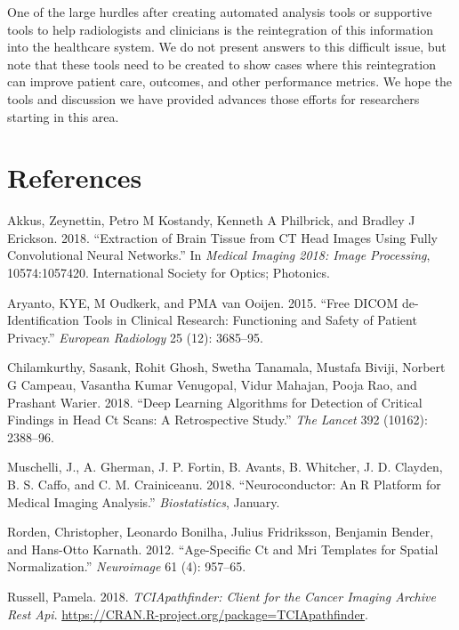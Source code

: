 \documentclass[]{elsarticle} %
\begin{document}
One of the large hurdles after creating automated analysis tools or
supportive tools to help radiologists and clinicians is the
reintegration of this information into the healthcare system. We do not
present answers to this difficult issue, but note that these tools need
to be created to show cases where this reintegration can improve patient
care, outcomes, and other performance metrics. We hope the tools and
discussion we have provided advances those efforts for researchers
starting in this area.

\hypertarget{references}{%
\section*{References}\label{references}}

\hypertarget{refs}{}
\leavevmode\hypertarget{ref-ct_bet}{}%
Akkus, Zeynettin, Petro M Kostandy, Kenneth A Philbrick, and Bradley J
Erickson. 2018. ``Extraction of Brain Tissue from CT Head Images Using
Fully Convolutional Neural Networks.'' In \emph{Medical Imaging 2018:
Image Processing}, 10574:1057420. International Society for Optics;
Photonics.

\leavevmode\hypertarget{ref-aryanto2015free}{}%
Aryanto, KYE, M Oudkerk, and PMA van Ooijen. 2015. ``Free DICOM
de-Identification Tools in Clinical Research: Functioning and Safety of
Patient Privacy.'' \emph{European Radiology} 25 (12): 3685--95.

\leavevmode\hypertarget{ref-cq500}{}%
Chilamkurthy, Sasank, Rohit Ghosh, Swetha Tanamala, Mustafa Biviji,
Norbert G Campeau, Vasantha Kumar Venugopal, Vidur Mahajan, Pooja Rao,
and Prashant Warier. 2018. ``Deep Learning Algorithms for Detection of
Critical Findings in Head Ct Scans: A Retrospective Study.'' \emph{The
Lancet} 392 (10162): 2388--96.

\leavevmode\hypertarget{ref-neuroconductor}{}%
Muschelli, J., A. Gherman, J. P. Fortin, B. Avants, B. Whitcher, J. D.
Clayden, B. S. Caffo, and C. M. Crainiceanu. 2018. ``Neuroconductor: An
R Platform for Medical Imaging Analysis.'' \emph{Biostatistics},
January.

\leavevmode\hypertarget{ref-rorden2012age}{}%
Rorden, Christopher, Leonardo Bonilha, Julius Fridriksson, Benjamin
Bender, and Hans-Otto Karnath. 2012. ``Age-Specific Ct and Mri Templates
for Spatial Normalization.'' \emph{Neuroimage} 61 (4): 957--65.

\leavevmode\hypertarget{ref-TCIApathfinder}{}%
Russell, Pamela. 2018. \emph{TCIApathfinder: Client for the Cancer
Imaging Archive Rest Api}.
\url{https://CRAN.R-project.org/package=TCIApathfinder}.
\end{document}
